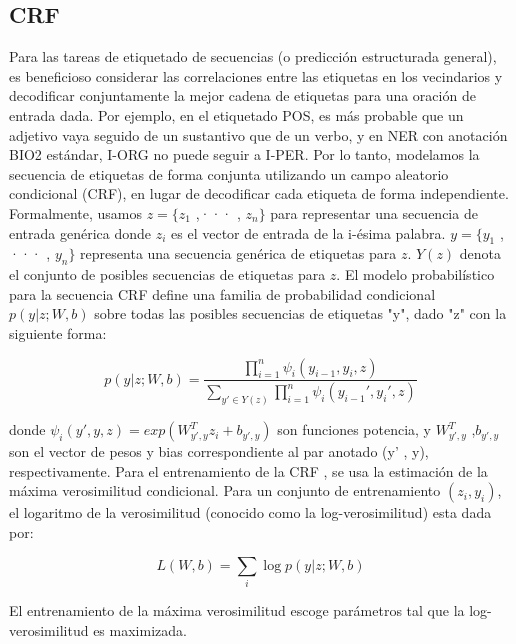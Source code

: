 \documentclass[runningheads]{llncs}
\begin{document}
\subsection{CRF}

Para las tareas de etiquetado de secuencias (o predicción estructurada general), es beneficioso 
considerar las correlaciones entre las etiquetas en los vecindarios y decodificar conjuntamente 
la mejor cadena de etiquetas para una oración de entrada dada. Por ejemplo, en el etiquetado POS, 
es más probable que un adjetivo vaya seguido de un sustantivo que de un verbo, y en NER con anotación 
BIO2 estándar, I-ORG no puede seguir a I-PER. Por lo tanto, 
modelamos la secuencia de etiquetas de forma conjunta utilizando un campo aleatorio condicional 
(CRF), en lugar de decodificar cada etiqueta de forma independiente. 
Formalmente, usamos $z = \{z_{1}$ ,··· , $z_{n} \}$ para representar una secuencia de entrada 
genérica donde $z_{i}$ es el vector de entrada de la i-ésima palabra. $y = \{y_{1}$ , ··· , $y_n \}$ 
representa una secuencia genérica de etiquetas para $z$. $Y(z)$ denota el conjunto de posibles 
secuencias de etiquetas para $z$. El modelo probabilístico para la secuencia CRF define una 
familia de probabilidad condicional $p(y|z; W, b)$ sobre todas las posibles secuencias de 
etiquetas "y", dado "z" con la siguiente forma:

\begin{equation}
	p(y|z; W, b) =  \frac {\prod_{i=1}^{n} \psi_{i} (y_{i-1}, y_{i} ,z)}
	{\sum_{y' \in Y(z)} \prod_{i=1}^{n} \psi_{i} (y_{i-1}', y_{i}' , z)}
\end{equation}

donde $\psi_{i}(y',y, z) = exp(W_{y',y}^{T} z_{i}+ b_{y',y} )$ son funciones potencia, 
y $W_{y',y}^{T}$ ,$b_{y',y}$  son  el vector de pesos y bias correspondiente al par anotado 
(y' , y), respectivamente. Para el entrenamiento de la CRF , se usa la estimación de la máxima 
verosimilitud condicional. Para un conjunto de entrenamiento ${(z_{i} , y_{i} )}$, el 
logaritmo de la verosimilitud (conocido como la log-verosimilitud) esta dada por:

\begin{equation}
	L(W, b) =\sum_{i}{\log p(y|z; W, b)}
\end{equation}



El entrenamiento de la máxima verosimilitud escoge parámetros tal que la log-verosimilitud 
es maximizada.
\end{document}

